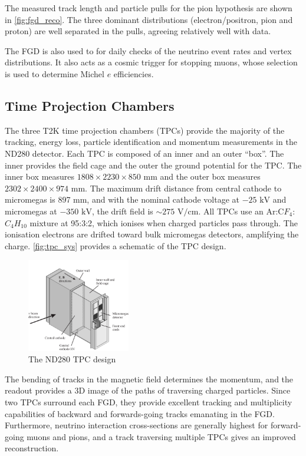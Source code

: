 The measured track length and particle pulls for the pion hypothesis are shown in \autoref{fig:fgd_reco}. The three dominant distributions (electron/positron, pion and proton) are well separated in the pulls, agreeing relatively well with data.

The FGD is also used to for daily checks of the neutrino event rates and vertex distributions. It also acts as a cosmic trigger for stopping muons, whose selection is used to determine Michel $e$ efficiencies.

\subsection{Time Projection Chambers}
The three T2K time projection chambers (TPCs)\cite{t2k_tpc} provide the majority of the tracking, energy loss, particle identification and momentum measurements in the ND280 detector. Each TPC is composed of an inner and an outer ``box''. The inner provides the field cage and the outer the ground potential for the TPC. The inner box measures $1808\times2230\times850\text{ mm}$ and the outer box measures $2302\times2400\times974\text{ mm}$. The maximum drift distance from central cathode to micromegas is 897 mm, and with the nominal cathode voltage at $-25\text{ kV}$ and micromegas at $-350\text{ kV}$, the drift field is $\sim 275\text{ V/cm}$. All TPCs use an Ar:C$F_4$:$C_4H_{10}$ mixture at 95:3:2, which ionises when charged particles pass through. The ionisation electrons are drifted toward bulk micromegas detectors\cite{micromegas_1, micromegas_2}, amplifying the charge. \autoref{fig:tpc_sys} provides a schematic of the TPC design.
\begin{figure}[h]
	\includegraphics[width=0.4\textwidth, trim={0mm 0mm 0mm 0mm}, clip,page=1]{figures/det_chap/tpc/tpc_1}
	\caption{The ND280 TPC design}
	\label{fig:tpc_sys}
\end{figure}

The bending of tracks in the magnetic field determines the momentum, and the readout provides a 3D image of the paths of traversing charged particles. Since two TPCs surround each FGD, they provide excellent tracking and multiplicity capabilities of backward and forwards-going tracks emanating in the FGD. Furthermore, neutrino interaction cross-sections are generally highest for forward-going muons and pions, and a track traversing multiple TPCs gives an improved reconstruction.

